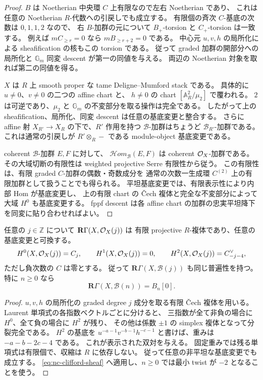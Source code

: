 \begin{proof}
$B$ は Noetherian 中央環 $C$ 上有限なので左右 Noetherian であり、
これは任意の Noetherian $R$-代数への引戻しでも成立する。
有限個の斉次 $C$-基底の次数は $0,1,1,2$ なので、
右 $B$-加群の元について $B_+$-torsion と $C_+$-torsion は一致する。
例えば $mC_{\ge r}=0$ なら $mB_{\ge r+2}=0$ である。
中心元 $u,v,h$ の局所化による sheafification の核もこの torsion である。
従って graded 加群の開部分への局所化と $\mathbb G_m$ 同変 descent が第一の同値を与える。
両辺の Noetherian 対象を取れば第二の同値を得る。

$X$ は $R$ 上 smooth proper な tame Deligne--Mumford stack である。
具体的に $u\ne0$、$v\ne0$ の二つの affine chart と、
$h\ne0$ の chart $[\mathbb A^2_R/\mu_2]$ で覆われる。
$2$ は可逆であり、$\mu_2$ と $\mathbb G_m$ の不変部分を取る操作は完全である。
したがって上の sheafification、局所化、同変 descent は任意の基底変更と整合する。
さらに affine 射 $X_{R'}\to X_R$ の下で、$R'$ 作用を持つ
$\mathcal B$-加群はちょうど $\mathcal B_{R'}$-加群である。
これは通常の引戻しが $R'\otimes_R-$ である module-object 基底変更である。

coherent $\mathcal B$-加群 $E,F$ に対して、
$\mathcal Hom_{\mathcal B}(E,F)$ は coherent $\mathcal O_X$-加群である。
その大域切断の有限性は weighted projective Serre 有限性から従う。
この有限性は、有限 graded $C$-加群の偶数・奇数成分を
通常の次数一生成環 $C^{(2)}$ 上の有限加群として扱うことでも得られる。
平坦基底変更では、有限表示性により内部 Hom が基底変更し、
上の有限 chart の \v{C}ech 複体と完全な不変部分によって大域 $H^0$ も基底変更する。
fppf descent は各 affine chart の加群の忠実平坦降下を同変に貼り合わせればよい。
\end{proof}

\begin{lemma}\label{lem:nc-weighted-cohomology}
任意の $j\in\mathbb Z$ について $\mathbf R\Gamma(X,\mathcal O_X(j))$ は
有限 projective $R$-複体であり、任意の基底変更と可換する。
\[
 H^0(X,\mathcal O_X(j))=C_j,\qquad H^1(X,\mathcal O_X(j))=0,
 \qquad H^2(X,\mathcal O_X(j))=C_{-j-4}^{\vee},
\]
ただし負次数の $C$ は零とする。
従って $\mathbf R\Gamma(X,\mathcal B(j))$ も同じ普遍性を持つ。
特に $n\ge0$ なら
\[
 \mathbf R\Gamma(X,\mathcal B(n))=B_n[0].
 \tag{NCF-2}\label{eq:nc-full-orbit-cohomology}
\]
\end{lemma}

\begin{proof}
$u,v,h$ の局所化の graded degree $j$ 成分を取る有限 \v{C}ech 複体を用いる。
Laurent 単項式の各指数ベクトルごとに分けると、
三指数が全て非負の場合に $H^0$、全て負の場合に $H^2$ が残り、
その他は係数 $\pm1$ の simplex 複体となって分裂完全である。
$H^2$ の基底を $u^{-a-1}v^{-b-1}h^{-c-1}$ と書けば、重みは $-a-b-2c-4$ である。
これが表示された双対を与える。
固定重みでは残る単項式は有限個で、収縮は $R$ に依存しない。
従って任意の非平坦な基底変更でも成立する。
\eqref{eq:nc-clifford-sheaf} へ適用し、$n\ge0$ では最小 twist が $-2$ となることを使う。
\end{proof}

